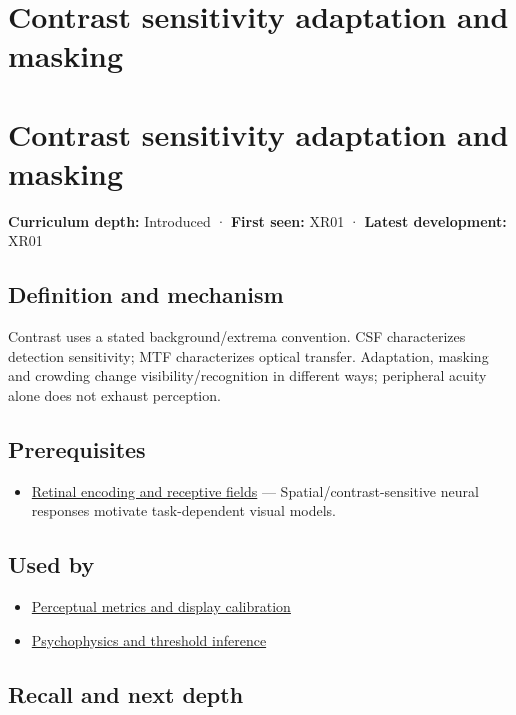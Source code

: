 \hypertarget{appendix-b3aa9e8e01ad}{}
\section*{Contrast sensitivity adaptation and masking}
\section{Contrast sensitivity adaptation and masking}\label{contrast-sensitivity-adaptation-and-masking}

\textbf{Curriculum depth:} Introduced · \textbf{First seen:} XR01 · \textbf{Latest development:} XR01

\subsection{Definition and mechanism}\label{definition-and-mechanism}

Contrast uses a stated background/extrema convention. CSF characterizes detection sensitivity; MTF characterizes optical transfer. Adaptation, masking and crowding change visibility/recognition in different ways; peripheral acuity alone does not exhaust perception.

\subsection{Prerequisites}\label{prerequisites}

\begin{itemize}
\tightlist
\item
  \hyperref[appendix-7281c15ac44a]{Retinal encoding and receptive fields} --- Spatial/contrast-sensitive neural responses motivate task-dependent visual models.
\end{itemize}

\subsection{Used by}\label{used-by}

\begin{itemize}
\tightlist
\item
  \hyperref[appendix-b2c1846508bf]{Perceptual metrics and display calibration}
\item
  \hyperref[appendix-1759f03e8ce7]{Psychophysics and threshold inference}
\end{itemize}

\subsection{Recall and next depth}\label{recall-and-next-depth}

